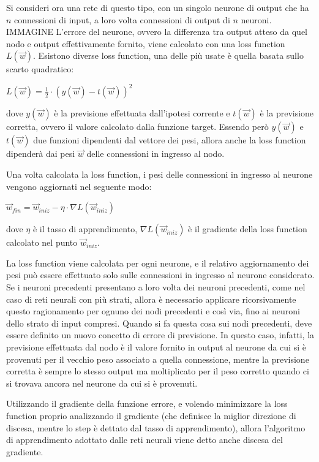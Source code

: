 Si consideri ora una rete di questo tipo, con un singolo neurone di output che
ha $n$ connessioni di input, a loro volta connessioni di output di $n$ neuroni.
IMMAGINE
L'errore del neurone, ovvero la differenza tra output atteso da quel nodo e
output effettivamente fornito, viene calcolato con una loss function
$L(\Vec{w})$.
Esistono diverse loss function, una delle più usate è quella basata sullo scarto
quadratico:
\begin{center}
    $L(\Vec{w}) = \frac{1}{2} \cdot \left( y(\Vec{w})- t(\Vec{w}) \right)^2$
\end{center}
dove $y(\Vec{w})$ è la previsione effettuata dall'ipotesi corrente e
$t(\Vec{w})$ è la previsione corretta, ovvero il valore calcolato dalla
funzione target.
Essendo però $y(\Vec{w})$ e $t(\Vec{w})$ due funzioni dipendenti dal vettore
dei pesi, allora anche la loss function dipenderà dai pesi $\Vec{w}$ delle
connessioni in ingresso al nodo.

Una volta calcolata la loss function, i pesi delle connessioni in ingresso al
neurone vengono aggiornati nel seguente modo:
\begin{center}
    $\Vec{w}_{fin} = \Vec{w}_{iniz} - \eta \cdot \nabla L(\Vec{w}_{iniz})$
\end{center}
dove $\eta$ è il tasso di apprendimento, $\nabla L(\Vec{w}_{iniz})$ è il
gradiente della loss function calcolato nel punto $\Vec{w}_{iniz}$.

La loss function viene calcolata per ogni neurone, e il relativo aggiornamento
dei pesi può essere effettuato solo sulle connessioni in ingresso al neurone
considerato.
Se i neuroni precedenti presentano a loro volta dei neuroni precedenti, come nel
caso di reti neurali con più strati, allora è necessario applicare
ricorsivamente questo ragionamento per ognuno dei nodi precedenti e così via,
fino ai neuroni dello strato di input compresi.
Quando si fa questa cosa sui nodi precedenti, deve essere definito un nuovo
concetto di errore di previsione. In questo caso, infatti, la previsione
effettuata dal nodo è il valore fornito in output al neurone da cui si è
provenuti per il vecchio peso associato a quella connessione, mentre la
previsione corretta è sempre lo stesso output ma moltiplicato per il peso
corretto quando ci si trovava ancora nel neurone da cui si è provenuti.

Utilizzando il gradiente della funzione errore, e volendo minimizzare la loss
function proprio analizzando il gradiente (che definisce la miglior direzione di
discesa, mentre lo step è dettato dal tasso di apprendimento), allora
l'algoritmo di apprendimento adottato dalle reti neurali viene detto anche
discesa del gradiente.

